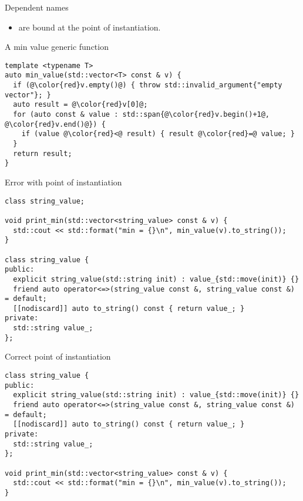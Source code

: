 \begin{frame}[t,fragile]{Dependent names}
\begin{itemize}
  \item {} are bound at the point of instantiation.
\end{itemize}
\begin{block}{A min value generic function}
\begin{lstlisting}[escapechar=@]
template <typename T>
auto min_value(std::vector<T> const & v) {
  if (@\color{red}v.empty()@) { throw std::invalid_argument{"empty vector"}; }
  auto result = @\color{red}v[0]@;
  for (auto const & value : std::span{@\color{red}v.begin()+1@, @\color{red}v.end()@}) {
    if (value @\color{red}<@ result) { result @\color{red}=@ value; }
  }
  return result;
}
\end{lstlisting}
\end{block}
\end{frame}

\begin{frame}[t,fragile]
\begin{block}{Error with point of instantiation}
\begin{lstlisting}
class string_value;

void print_min(std::vector<string_value> const & v) {
  std::cout << std::format("min = {}\n", min_value(v).to_string());
}

class string_value {
public:
  explicit string_value(std::string init) : value_{std::move(init)} {}
  friend auto operator<=>(string_value const &, string_value const &) = default;
  [[nodiscard]] auto to_string() const { return value_; }
private:
  std::string value_;
};
\end{lstlisting}
\end{block}

\end{frame}


\begin{frame}[t,fragile]
\begin{block}{Correct point of instantiation}
\begin{lstlisting}
class string_value {
public:
  explicit string_value(std::string init) : value_{std::move(init)} {}
  friend auto operator<=>(string_value const &, string_value const &) = default;
  [[nodiscard]] auto to_string() const { return value_; }
private:
  std::string value_;
}; 

void print_min(std::vector<string_value> const & v) {
  std::cout << std::format("min = {}\n", min_value(v).to_string());
}

\end{lstlisting}
\end{block}

\end{frame}
